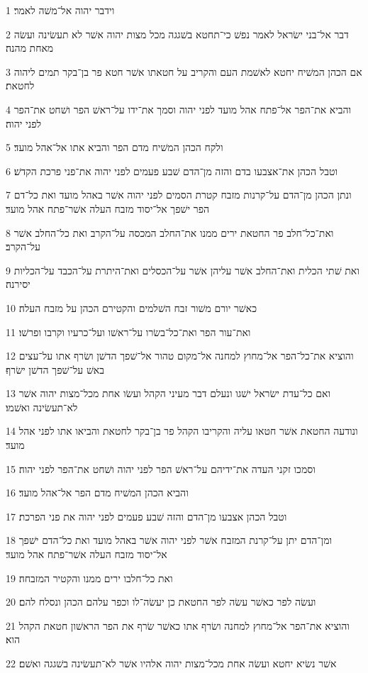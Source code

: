 \par 1 וידבר יהוה אל־משׁה לאמר׃
\par 2 דבר אל־בני ישׂראל לאמר נפשׁ כי־תחטא בשׁגגה מכל מצות יהוה אשׁר לא תעשׂינה ועשׂה מאחת מהנה׃
\par 3 אם הכהן המשׁיח יחטא לאשׁמת העם והקריב על חטאתו אשׁר חטא פר בן־בקר תמים ליהוה לחטאת׃
\par 4 והביא את־הפר אל־פתח אהל מועד לפני יהוה וסמך את־ידו על־ראשׁ הפר ושׁחט את־הפר לפני יהוה׃
\par 5 ולקח הכהן המשׁיח מדם הפר והביא אתו אל־אהל מועד׃
\par 6 וטבל הכהן את־אצבעו בדם והזה מן־הדם שׁבע פעמים לפני יהוה את־פני פרכת הקדשׁ׃
\par 7 ונתן הכהן מן־הדם על־קרנות מזבח קטרת הסמים לפני יהוה אשׁר באהל מועד ואת כל־דם הפר ישׁפך אל־יסוד מזבח העלה אשׁר־פתח אהל מועד׃
\par 8 ואת־כל־חלב פר החטאת ירים ממנו את־החלב המכסה על־הקרב ואת כל־החלב אשׁר על־הקרב׃
\par 9 ואת שׁתי הכלית ואת־החלב אשׁר עליהן אשׁר על־הכסלים ואת־היתרת על־הכבד על־הכליות יסירנה׃
\par 10 כאשׁר יורם משׁור זבח השׁלמים והקטירם הכהן על מזבח העלה׃
\par 11 ואת־עור הפר ואת־כל־בשׂרו על־ראשׁו ועל־כרעיו וקרבו ופרשׁו׃
\par 12 והוציא את־כל־הפר אל־מחוץ למחנה אל־מקום טהור אל־שׁפך הדשׁן ושׂרף אתו על־עצים באשׁ על־שׁפך הדשׁן ישׂרף׃
\par 13 ואם כל־עדת ישׂראל ישׁגו ונעלם דבר מעיני הקהל ועשׂו אחת מכל־מצות יהוה אשׁר לא־תעשׂינה ואשׁמו׃
\par 14 ונודעה החטאת אשׁר חטאו עליה והקריבו הקהל פר בן־בקר לחטאת והביאו אתו לפני אהל מועד׃
\par 15 וסמכו זקני העדה את־ידיהם על־ראשׁ הפר לפני יהוה ושׁחט את־הפר לפני יהוה׃
\par 16 והביא הכהן המשׁיח מדם הפר אל־אהל מועד׃
\par 17 וטבל הכהן אצבעו מן־הדם והזה שׁבע פעמים לפני יהוה את פני הפרכת׃
\par 18 ומן־הדם יתן על־קרנת המזבח אשׁר לפני יהוה אשׁר באהל מועד ואת כל־הדם ישׁפך אל־יסוד מזבח העלה אשׁר־פתח אהל מועד׃
\par 19 ואת כל־חלבו ירים ממנו והקטיר המזבחה׃
\par 20 ועשׂה לפר כאשׁר עשׂה לפר החטאת כן יעשׂה־לו וכפר עלהם הכהן ונסלח להם׃
\par 21 והוציא את־הפר אל־מחוץ למחנה ושׂרף אתו כאשׁר שׂרף את הפר הראשׁון חטאת הקהל הוא׃
\par 22 אשׁר נשׂיא יחטא ועשׂה אחת מכל־מצות יהוה אלהיו אשׁר לא־תעשׂינה בשׁגגה ואשׁם׃
